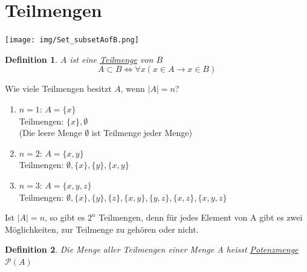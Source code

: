 \documentclass{report}
\newtheorem{mydef}{Definition}
\begin{document}
\section{Teilmengen}
\begin{center}\texttt{[image: img/Set\_subsetAofB.png]}\end{center}
\begin{mydef}$A$ ist eine \underline{Teilmenge} von $B$
\begin{equation}A \subset B \iff \forall x(x \in A \to x \in B)\end{equation}\end{mydef}

Wie viele Teilmengen besitzt $A$, wenn $|A| = n$?
\begin{enumerate}
\item $n = 1$: $A = \{x\}$ \\
Teilmengen: $\{x\}, \emptyset$\\
(Die leere Menge $\emptyset$ ist Teilmenge jeder Menge)
\item $n = 2$: $A = \{x, y\}$\\
Teilmengen: $\emptyset, \{x\}, \{y\}, \{x, y\}$
\item $n = 3$: $A = \{x, y, z\}$\\
Teilmengen: $\emptyset, \{x\}, \{y\}, \{z\}, \{x, y\}, \{y, z\}, \{x, z\}, \{x, y, z\}$\end{enumerate}
Ist $|A|=n$, so gibt es $2^n$ Teilmengen, denn für jedes Element von A gibt es zwei Möglichkeiten, zur Teilmenge zu gehören oder nicht.
\begin{mydef}Die Menge aller Teilmengen einer Menge A heisst \underline{Potenzmenge $\mathcal{P}(A)$}\end{mydef}
\end{document}
